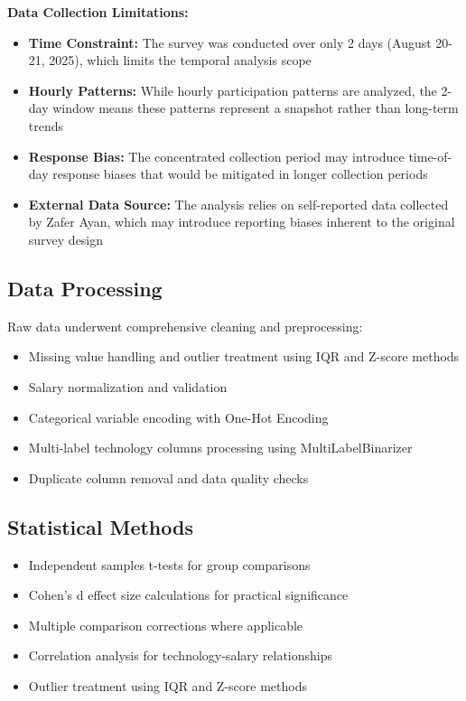 \documentclass[12pt,a4paper]{article}
\begin{document}
\textbf{Data Collection Limitations:}
\begin{itemize}
    \item \textbf{Time Constraint:} The survey was conducted over only 2 days (August 20-21, 2025), which limits the temporal analysis scope
    \item \textbf{Hourly Patterns:} While hourly participation patterns are analyzed, the 2-day window means these patterns represent a snapshot rather than long-term trends
    \item \textbf{Response Bias:} The concentrated collection period may introduce time-of-day response biases that would be mitigated in longer collection periods
    \item \textbf{External Data Source:} The analysis relies on self-reported data collected by Zafer Ayan, which may introduce reporting biases inherent to the original survey design
\end{itemize}

\subsection{Data Processing}
Raw data underwent comprehensive cleaning and preprocessing:
\begin{itemize}
    \item Missing value handling and outlier treatment using IQR and Z-score methods
    \item Salary normalization and validation
    \item Categorical variable encoding with One-Hot Encoding
    \item Multi-label technology columns processing using MultiLabelBinarizer
    \item Duplicate column removal and data quality checks
\end{itemize}

\subsection{Statistical Methods}
\begin{itemize}
    \item Independent samples t-tests for group comparisons
    \item Cohen's d effect size calculations for practical significance
    \item Multiple comparison corrections where applicable
    \item Correlation analysis for technology-salary relationships
    \item Outlier treatment using IQR and Z-score methods
\end{itemize}
\end{document}
